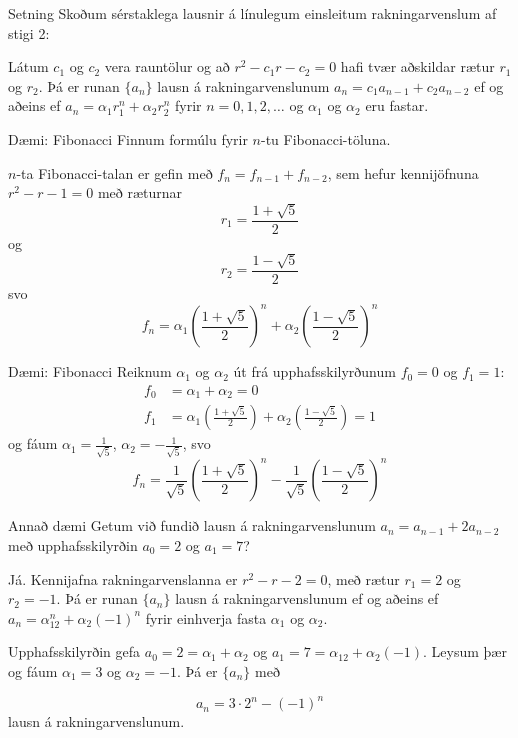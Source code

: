 \documentclass[handout]{beamer}
\begin{document}
\begin{frame}{Setning}
Skoðum sérstaklega lausnir á línulegum einsleitum rakningarvenslum af stigi 2:
\begin{tcolorbox}[title=Lausn einfaldra rakningarvensla af stigi 2]
Látum $c_1$ og $c_2$ vera rauntölur og að $r^2 - c_1r - c_2 = 0$ hafi tvær aðskildar rætur $r_1$ og $r_2$. Þá er runan $\{a_n\}$ lausn á rakningarvenslunum $a_n = c_1a_{n-1} + c_2a_{n-2}$ ef og aðeins ef $a_n = \alpha_1r_1^n + \alpha_2r^n_2$ fyrir $n=0,1,2,\ldots$ og $\alpha_1$ og $\alpha_2$ eru fastar.
\end{tcolorbox}

\end{frame}

\begin{frame}{Dæmi: Fibonacci}
    Finnum formúlu fyrir $n$-tu Fibonacci-töluna. \pause
    
    $n$-ta Fibonacci-talan er gefin með $f_n = f_{n-1} + f_{n-2}$, sem hefur kennijöfnuna $r^2 - r - 1 = 0$ með ræturnar 
    \[r_1 = \frac{1 + \sqrt{5}}{2} \]
    og
    \[r_2 = \frac{1 - \sqrt{5}}{2}\]
    svo
    \[
     f_n = \alpha_1\left(\frac{1 + \sqrt{5}}{2}\right)^n + \alpha_2\left(\frac{1 - \sqrt{5}}{2}\right)^n
    \]
\end{frame}
    
\begin{frame}{Dæmi: Fibonacci}
    Reiknum $\alpha_1$ og $\alpha_2$ út frá upphafsskilyrðunum $f_0 = 0$ og $f_1 = 1$:
    \begin{align*}
    f_0 &= \alpha_1 + \alpha_2 = 0\\
    f_1 &= \alpha_1\left(\frac{1 + \sqrt{5}}{2}\right) + \alpha_2\left(\frac{1 - \sqrt{5}}{2}\right) = 1
    \end{align*}
    og fáum $\alpha_1 = \frac{1}{\sqrt{5}}$, $\alpha_2 = -\frac{1}{\sqrt{5}}$, svo
    \[
     f_n = \frac{1}{\sqrt{5}}\left(\frac{1 + \sqrt{5}}{2}\right)^n -\frac{1}{\sqrt{5}}\left(\frac{1 - \sqrt{5}}{2}\right)^n
    \]
\end{frame}

\begin{frame}{Annað dæmi}
Getum við fundið lausn á rakningarvenslunum $a_n = a_{n-1} + 2a_{n-2}$ með upphafsskilyrðin $a_0 = 2$ og $a_1 = 7$? \pause

\vspace{0.5cm}
Já. Kennijafna rakningarvenslanna er $r^2 - r - 2 = 0$, með rætur $r_1 = 2$ og $r_2 = -1$. Þá er runan $\{a_n\}$ lausn á rakningarvenslunum ef og aðeins ef $a_n = \alpha_12^n + \alpha_2(-1)^n$ fyrir einhverja fasta $\alpha_1$ og $\alpha_2$.\pause

Upphafsskilyrðin gefa $a_0 = 2 = \alpha_1 + \alpha_2$ og $a_1 = 7 = \alpha_12 + \alpha_2(-1)$. Leysum þær og fáum $\alpha_1 = 3$ og $\alpha_2 = -1$. Þá er $\{a_n\}$ með

\[
 a_n = 3 \cdot 2^n - (-1)^n
\]
lausn á rakningarvenslunum.

\end{frame}
\end{document}
